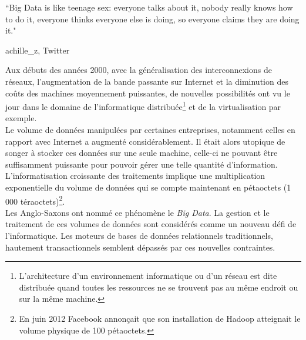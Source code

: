 \epigraph{``Big Data is like teenage sex: everyone talks about it, nobody really knows how to do it, everyone thinks everyone else is doing, so everyone claims they are doing it."}{\textup{achille\_z}, Twitter}

Aux débuts des années 2000, avec la généralisation des interconnexions de réseaux, l'augmentation de la bande passante sur Internet et la diminution des coûts des machines moyennement puissantes, de nouvelles possibilités ont vu le jour dans le domaine de l'informatique distribuée\footnote{L’architecture d'un environnement informatique ou d'un réseau est dite distribuée quand toutes les ressources ne se trouvent pas au même endroit ou sur la même machine.\cite{Wikipedia_architecture_distribuee}} et de la virtualisation par exemple.\\

Le volume de données manipulées par certaines entreprises, notamment celles en rapport avec Internet a augmenté considérablement. Il était alors utopique de songer à stocker ces données sur une seule machine, celle-ci ne pouvant être suffisamment puissante pour pouvoir gérer une telle quantité d'information. L'informatisation croissante des traitements implique une multiplication exponentielle du volume de données qui se compte maintenant en pétaoctets (1 000 téraoctets)\footnote{En juin 2012 Facebook annonçait que son installation de Hadoop atteignait le volume physique de 100 pétaoctets.\cite{facebook_hadoop}}.\\

Les Anglo-Saxons ont nommé ce phénomène le \textit{Big Data}. La gestion et le traitement de ces volumes de données sont considérés comme un nouveau défi de l'informatique. Les moteurs de bases de données relationnels traditionnels, hautement transactionnels semblent dépassés par ces nouvelles contraintes.
